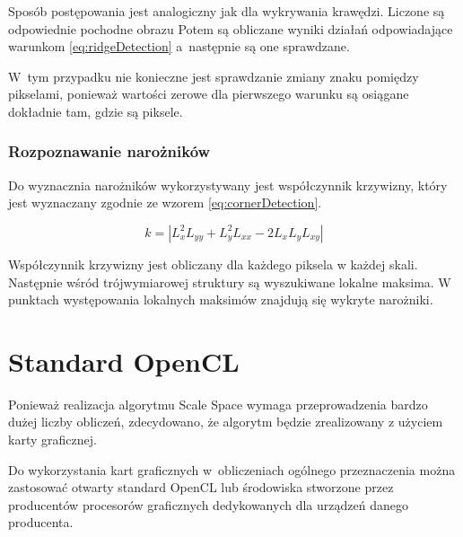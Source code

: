 Sposób postępowania jest analogiczny jak dla wykrywania krawędzi. Liczone są odpowiednie pochodne obrazu
Potem są obliczane wyniki działań odpowiadające warunkom \ref{eq:ridgeDetection} a~następnie są one sprawdzane.

W~tym przypadku nie konieczne jest sprawdzanie zmiany znaku pomiędzy pikselami, ponieważ wartości zerowe dla pierwszego warunku są osiągane dokładnie tam, gdzie są piksele. 

\subsubsection{Rozpoznawanie narożników}
\label{subsubsec:rozpoznawanieNaroznikow}

Do wyznacznia narożników wykorzystywany jest współczynnik krzywizny, który jest wyznaczany zgodnie ze wzorem \ref{eq:cornerDetection}.

\begin{equation}
\label{eq:cornerDetection}
k = |L_x^2L_{yy}  + L_y^2L_{xx} - 2L_xL_yL_{xy}|
\end{equation}

Współczynnik krzywizny jest obliczany dla każdego piksela w każdej skali. Następnie wśród trójwymiarowej struktury są wyszukiwane lokalne maksima. W punktach występowania lokalnych maksimów znajdują się wykryte narożniki.


\section{Standard OpenCL}
\label{sec:OpenCL}

Ponieważ realizacja algorytmu Scale Space wymaga przeprowadzenia bardzo dużej liczby obliczeń, zdecydowano, że algorytm będzie zrealizowany z użyciem karty graficznej.

Do wykorzystania kart graficznych w~obliczeniach ogólnego przeznaczenia można zastosować otwarty standard OpenCL lub środowiska stworzone przez producentów procesorów graficznych dedykowanych dla urządzeń danego producenta.

